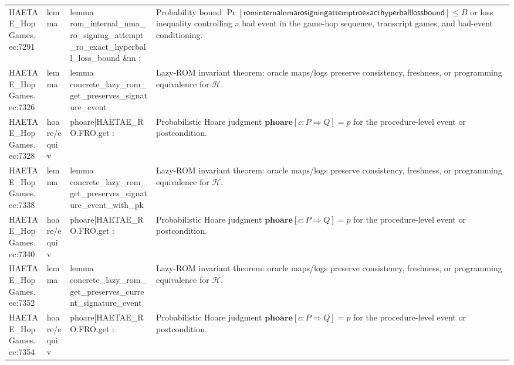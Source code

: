 \documentclass[10pt]{article}
\begin{document}
\begin{longtable}{L{0.11\textwidth}L{0.055\textwidth}L{0.385\textwidth}L{0.41\textwidth}}
HAETAE\_\allowbreak{}HopGames.\allowbreak{}ec:\allowbreak{}7291 & lemma & {\ttfamily\scriptsize lemma rom\_\allowbreak{}internal\_\allowbreak{}nma\_\allowbreak{}ro\_\allowbreak{}signing\_\allowbreak{}attempt\_\allowbreak{}ro\_\allowbreak{}exact\_\allowbreak{}hyperball\_\allowbreak{}loss\_\allowbreak{}bound \&m :} & Probability bound $\Pr[\mathsf{rominternalnmarosigningattemptroexacthyperballlossbound}]\le B$ or loss inequality controlling a bad event in the game-hop sequence, transcript games, and bad-event conditioning. \\
HAETAE\_\allowbreak{}HopGames.\allowbreak{}ec:\allowbreak{}7326 & lemma & {\ttfamily\scriptsize lemma concrete\_\allowbreak{}lazy\_\allowbreak{}rom\_\allowbreak{}get\_\allowbreak{}preserves\_\allowbreak{}signature\_\allowbreak{}event} & Lazy-ROM invariant theorem: oracle maps/logs preserve consistency, freshness, or programming equivalence for $\mathcal H$. \\
HAETAE\_\allowbreak{}HopGames.\allowbreak{}ec:\allowbreak{}7328 & hoare/equiv & {\ttfamily\scriptsize phoare[HAETAE\_\allowbreak{}RO.FRO.get :} & Probabilistic Hoare judgment $\mathbf{phoare}[c:P\Rightarrow Q]=p$ for the procedure-level event or postcondition. \\
HAETAE\_\allowbreak{}HopGames.\allowbreak{}ec:\allowbreak{}7338 & lemma & {\ttfamily\scriptsize lemma concrete\_\allowbreak{}lazy\_\allowbreak{}rom\_\allowbreak{}get\_\allowbreak{}preserves\_\allowbreak{}signature\_\allowbreak{}event\_\allowbreak{}with\_\allowbreak{}pk} & Lazy-ROM invariant theorem: oracle maps/logs preserve consistency, freshness, or programming equivalence for $\mathcal H$. \\
HAETAE\_\allowbreak{}HopGames.\allowbreak{}ec:\allowbreak{}7340 & hoare/equiv & {\ttfamily\scriptsize phoare[HAETAE\_\allowbreak{}RO.FRO.get :} & Probabilistic Hoare judgment $\mathbf{phoare}[c:P\Rightarrow Q]=p$ for the procedure-level event or postcondition. \\
HAETAE\_\allowbreak{}HopGames.\allowbreak{}ec:\allowbreak{}7352 & lemma & {\ttfamily\scriptsize lemma concrete\_\allowbreak{}lazy\_\allowbreak{}rom\_\allowbreak{}get\_\allowbreak{}preserves\_\allowbreak{}current\_\allowbreak{}signature\_\allowbreak{}event} & Lazy-ROM invariant theorem: oracle maps/logs preserve consistency, freshness, or programming equivalence for $\mathcal H$. \\
HAETAE\_\allowbreak{}HopGames.\allowbreak{}ec:\allowbreak{}7354 & hoare/equiv & {\ttfamily\scriptsize phoare[HAETAE\_\allowbreak{}RO.FRO.get :} & Probabilistic Hoare judgment $\mathbf{phoare}[c:P\Rightarrow Q]=p$ for the procedure-level event or postcondition. \\

\end{longtable}
\end{document}
